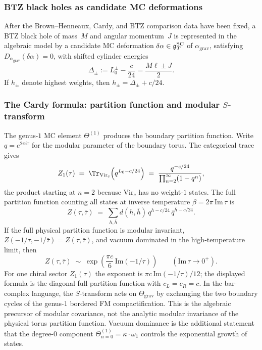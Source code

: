 \subsubsection*{BTZ black holes as candidate MC deformations}

\begin{definition}
\label{def:btz-deformation}
After the Brown--Henneaux, Cardy, and BTZ comparison data have been
fixed, a BTZ black hole of mass~$M$ and angular momentum~$J$ is
represented in the algebraic model by a candidate MC deformation
\(\delta\alpha \in \mathfrak{g}^{\mathrm{SC}}_T\) of \(\alpha_{\mathrm{grav}}\), satisfying
\(D_{\alpha_{\mathrm{grav}}}(\delta\alpha) = 0\), with shifted
cylinder energies
\[
\Delta_\pm := L_0^\pm-\frac{c}{24}
= \frac{M\ell \pm J}{2}.
\]
If $h_\pm$ denote highest weights, then
$h_\pm=\Delta_\pm+c/24$.
\end{definition}

\subsubsection*{The Cardy formula: partition function and modular $S$-transform}

The genus-$1$ MC element $\Theta^{(1)}$ produces the boundary
partition function. Write $q = e^{2\pi i\tau}$ for the modular
parameter of the boundary torus. The categorical trace gives
\begin{equation}\label{eq:gravity-Z1}
Z_1(\tau)
\;=\;
\Tr_{\mathrm{Vir}_c}\!\left(q^{L_0 - c/24}\right)
\;=\;
\frac{q^{-c/24}}{\prod_{n=2}^{\infty}(1-q^n)},
\end{equation}
the product starting at $n = 2$ because $\mathrm{Vir}_c$ has no
weight-$1$ states. The full partition function counting all states
at inverse temperature $\beta = 2\pi\,\mathrm{Im}\,\tau$ is
\begin{equation}\label{eq:gravity-Z-full}
Z(\tau,\bar\tau)
\;=\;
\sum_{h,\bar h}
d(h,\bar h)\,q^{h - c/24}\,\bar q^{\bar h - c/24}.
\end{equation}
If the full physical partition function is modular invariant,
$Z(-1/\tau, -1/\bar\tau) = Z(\tau,\bar\tau)$, and vacuum dominated
in the high-temperature limit, then
\begin{equation}\label{eq:gravity-vacuum-dominance}
Z(\tau,\bar\tau)
\;\sim\;
\exp\!\left(
 \frac{\pi c}{6}\,\mathrm{Im}(-1/\tau)
\right)
\qquad (\mathrm{Im}\,\tau \to 0^+).
\end{equation}
For one chiral sector $Z_1(\tau)$ the exponent is
$\pi c\,\mathrm{Im}(-1/\tau)/12$; the displayed formula is the
diagonal full partition function with $c_L=c_R=c$.
In the bar-complex language, the $S$-transform acts on
$\Theta_{\mathrm{grav}}$ by exchanging the two boundary cycles of
the genus-$1$ bordered FM compactification. This is the algebraic
precursor of modular covariance, not the analytic modular invariance
of the physical torus partition function. Vacuum dominance is the
additional statement that the degree-$0$ component
$\Theta^{(1)}_{n=0} = \kappa\cdot\omega_1$ controls the
exponential growth of states.

